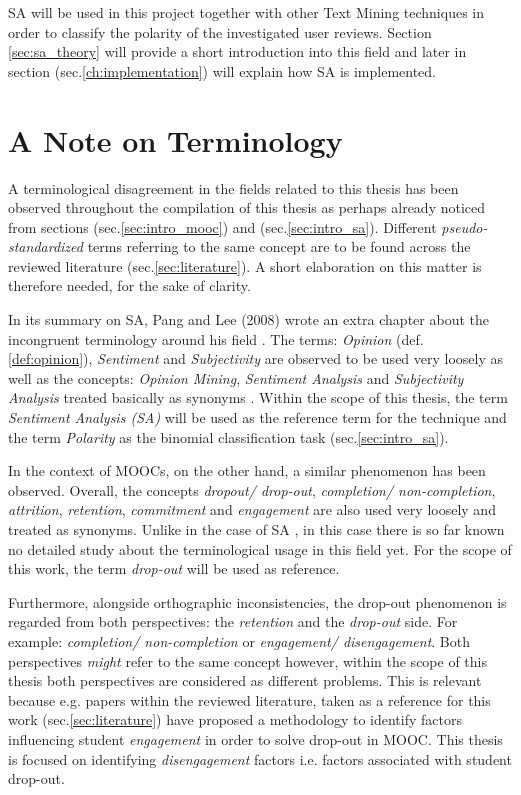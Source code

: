 \documentclass[
	a4paper,
	pdftex,
	12pt,	
	footinclude=true,
	fleqn,
	final,
	]{report}%
\begin{document}
SA will be used in this project together with other Text Mining techniques in order to
classify the polarity of the investigated user reviews. Section \ref{sec:sa_theory} will
provide a short introduction into this field and later in section (sec.\ref{ch:implementation})
will explain how SA is implemented.

\vspace{-0.45cm}
\section{A Note on Terminology}
\label{sec:intro_term}
\vspace{-0.3cm}

A terminological disagreement in the fields related to this thesis has been observed 
throughout the compilation of this thesis as perhaps already noticed 
from sections (sec.\ref{sec:intro_mooc}) and (sec.\ref{sec:intro_sa}). 
Different \emph{pseudo-standardized} terms referring to the same concept are 
to be found across the reviewed literature (sec.\ref{sec:literature}).
A short elaboration on this matter is therefore needed, for the sake of clarity.

In its summary on SA, Pang and Lee (2008) wrote an extra chapter about the
incongruent terminology around his field \cite{Pang2008}. The terms: \emph{Opinion} (def. \ref{def:opinion}),
\emph{Sentiment} and \emph{Subjectivity} are observed to be used very loosely 
as well as the concepts: \emph{Opinion Mining}, \emph{Sentiment Analysis} and \emph{Subjectivity Analysis} 
treated basically as synonyms \cite{Pang2008}. Within the scope of this thesis, the term
\emph{Sentiment Analysis (SA)} will be used as the reference term for the technique
and the term \emph{Polarity} as the binomial classification task (sec.\ref{sec:intro_sa}). 

In the context of MOOCs, on the other hand, a similar phenomenon has been observed.  
Overall, the concepts \emph{dropout/ drop-out}, \emph{completion/ non-completion}, 
\emph{attrition}, \emph{retention}, \emph{commitment} and \emph{engagement} are 
also used very loosely and treated as synonyms. Unlike in the case of SA \cite{Pang2008}, 
in this case there is so far known no detailed study about the terminological usage in 
this field yet. For the scope of this work, the term \emph{drop-out} 
will be used as reference. 

Furthermore, alongside orthographic inconsistencies, 
the drop-out phenomenon is regarded from both
perspectives: the \emph{retention} and the \emph{drop-out} side. For example:
\emph{completion/ non-completion} or \emph{engagement/ disengagement}.
Both perspectives \emph{might} refer to the same concept however, within the 
scope of this thesis both perspectives are considered as different problems. 
This is relevant because e.g. papers within the reviewed literature, taken as a 
reference for this work (sec.\ref{sec:literature})
have proposed a methodology to identify factors influencing student \emph{engagement} 
\cite{Hayes2015,Adamopoulos2013} in order to solve drop-out in MOOC. 
This thesis is focused on identifying \emph{disengagement}
factors i.e. factors associated with student drop-out.
\end{document}
